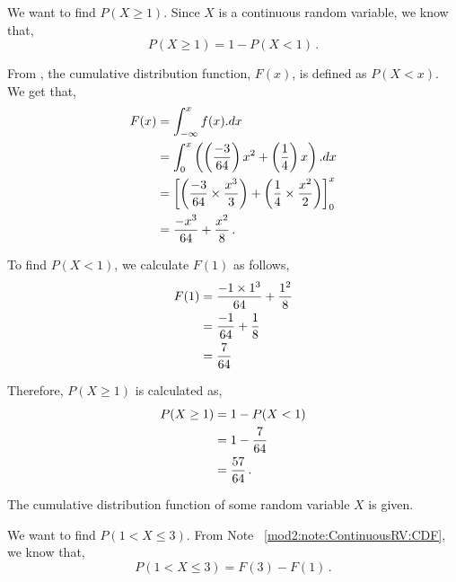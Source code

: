 \begin{subquestions}
\begin{subsubquestions}
We want to find $P(X \geq 1)$. Since $X$ is a continuous random variable, we know that, 
\begin{equation}
	P(X \geq 1) = 1 - P(X < 1) \,.
\end{equation}

From , the cumulative distribution function, $F(x)$, is defined as $P(X<x)$.
We get that,
\begin{align}
		F(x) & = \int_{-\infty}^{x} f(x).dx	\nonumber \\
		     & = \int_{0}^{x} \left( \left( \frac{-3}{64}\right)x^2+\left(\frac{1}{4}\right)x \right) .dx \nonumber \\
		     & = \left[ \left(\frac{-3}{64} \times \frac{x^3}{3}\right)+\left(\frac{1}{4}\times \frac{x^2}{2}\right) \right]^{x}_{0} \nonumber \\
		     & = \frac{-x^3}{64} + \frac{x^2}{8} \,.
\end{align}

To find $P(X<1)$, we calculate $F(1)$ as follows,
\begin{align}
	F(1) & = \frac{-1 \times 1^3}{64} + \frac{1^2}{8} \nonumber \\
	     & = \frac{-1}{64} + \frac{1}{8} \nonumber \\
	     & = \frac{7}{64}
\end{align}

Therefore, $P(X \geq 1)$ is calculated as,
\begin{align}
	P(X \geq 1) & = 1 - P(X < 1) \nonumber \\
	            & = 1 - \frac{7}{64} \nonumber \\
	            & = \frac{57}{64} \,.
\end{align}

\end{subsubquestions}


\subquestion

The cumulative distribution function of some random variable $X$ is given.

\begin{subsubquestions}

\subsubquestion

We want to find $P(1 < X \leq 3)$. From Note ~\ref{mod2:note:ContinuousRV:CDF}, we know that,
\begin{equation}
	P( 1 < X \leq 3) = F(3) - F(1) \,.
\end{equation}


\end{subsubquestions}
\end{subquestions}
